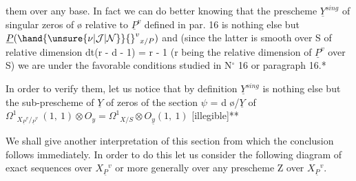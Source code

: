 
them over any base.  In fact we can do better knowing that the
prescheme $\underline{Y}^{sing}$ of singular zeros of \o{} relative to $\underline{P}^{v}$ defined in
par. 16 is nothing else but $\underline{P}(\hand{\unsure{\nu|\mathcal{J}|\mathcal{N}}}{}^{v}{}_{x/P})$ and (since the latter is
smooth over S of relative dimension dt(r - d - 1) = r - 1 (r being
the relative dimension of $\underline{P}^{v}$ over S) we are under the favorable
conditions studied in N$^\circ$ 16 or paragraph 16.*

In order to verify them, let us notice that by definition
$\underline{Y}^{sing}$ is nothing else but the sub-prescheme of $\underline{Y}$ of zeros of the
section $\psi$ = d \o/$\underline{Y}$ of $\Omega^{1}{}_{X_{\underline{P}}{}^{v}/{}_{\underline{P}}{}^{v}}\ (1,\ 1) \otimes O_{y} = \Omega^{1}{}_{X/S} \otimes O_{\underline{y}}(1,\ 1)$
[illegible]**

We shall give another interpretation of this section from
which the conclusion follows immediately.  In order to do this let
us consider the following diagram of exact sequences over $X_{\underline{P}}{}^{v}$ or
more generally over any prescheme Z over $X_{\underline{P}}{}^{v}$.


